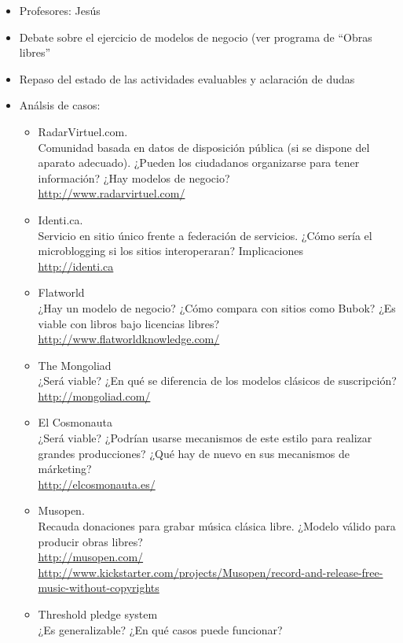\documentclass[a4paper,12pt]{article}
\begin{document}
\begin{itemize}
\item Profesores: Jesús
\item Debate sobre el ejercicio de modelos de negocio (ver programa de ``Obras libres''
\item Repaso del estado de las actividades evaluables y aclaración de dudas
\item Análsis de casos:
  \begin{itemize}
  \item RadarVirtuel.com. \\
    Comunidad basada en datos de disposición pública (si se dispone del aparato adecuado). ¿Pueden los ciudadanos organizarse para tener información? ¿Hay modelos de negocio? \\
    \url{http://www.radarvirtuel.com/}
  \item Identi.ca. \\
    Servicio en sitio único frente a federación de servicios. ¿Cómo sería el microblogging si los sitios interoperaran? Implicaciones \\
    \url{http://identi.ca}
  \item Flatworld \\
    ¿Hay un modelo de negocio? ¿Cómo compara con sitios como Bubok? ¿Es viable con libros bajo licencias libres?\\
    \url{http://www.flatworldknowledge.com/}
  \item The Mongoliad \\
    ¿Será viable? ¿En qué se diferencia de los modelos clásicos de suscripción? \\
    \url{http://mongoliad.com/}
  \item El Cosmonauta \\
    ¿Será viable? ¿Podrían usarse mecanismos de este estilo para realizar grandes producciones? ¿Qué hay de nuevo en sus mecanismos de márketing?\\
    \url{http://elcosmonauta.es/}
  \item Musopen. \\
    Recauda donaciones para grabar música clásica libre. ¿Modelo válido para producir obras libres? \\
    \url{http://musopen.com/} \\
    \url{http://www.kickstarter.com/projects/Musopen/record-and-release-free-music-without-copyrights}
  \item Threshold pledge system \\
    ¿Es generalizable? ¿En qué casos puede funcionar? \\

\end{itemize}
\end{itemize}
\end{document}
